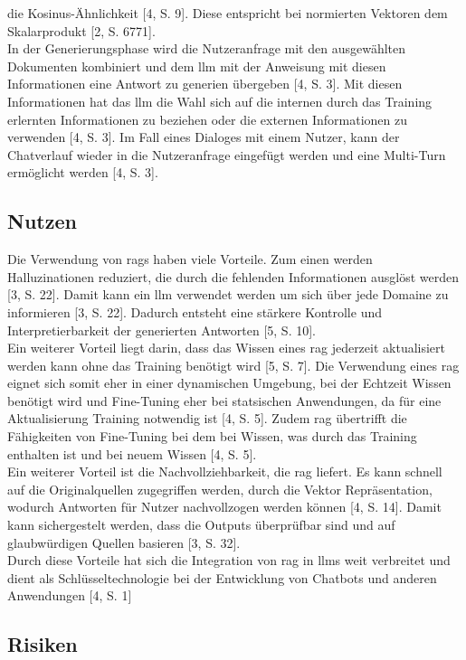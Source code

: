 die Kosinus-Ähnlichkeit [4, S. 9]. Diese entspricht bei normierten Vektoren dem Skalarprodukt  [2, S. 6771]. \\
In der Generierungsphase wird die Nutzeranfrage mit den ausgewählten Dokumenten kombiniert und dem \ac{llm} mit der Anweisung mit diesen Informationen eine 
Antwort zu generien übergeben [4, S. 3]. Mit diesen Informationen hat das \ac{llm} die Wahl sich auf die internen durch das Training erlernten Informationen zu
beziehen oder die externen Informationen zu verwenden [4, S. 3]. Im Fall eines Dialoges mit einem Nutzer, kann der Chatverlauf wieder in die Nutzeranfrage eingefügt 
werden und eine Multi-Turn ermöglicht werden [4, S. 3].

\subsection{Nutzen}

Die Verwendung von \acp{rag} haben viele Vorteile. Zum einen werden Halluzinationen reduziert, die durch die fehlenden Informationen ausglöst werden [3, S. 22]. Damit
kann ein \ac{llm} verwendet werden um sich über jede Domaine zu informieren [3, S. 22]. Dadurch entsteht eine stärkere Kontrolle und Interpretierbarkeit der
generierten Antworten [5, S. 10]. \\
Ein weiterer Vorteil liegt darin, dass das Wissen eines \ac{rag} jederzeit aktualisiert werden kann ohne das Training benötigt wird [5, S. 7]. Die Verwendung
eines \ac{rag} eignet sich somit eher in einer dynamischen Umgebung, bei der Echtzeit Wissen benötigt wird und Fine-Tuning eher bei statsischen Anwendungen, da 
für eine Aktualisierung Training notwendig ist [4, S. 5]. Zudem \ac{rag} übertrifft die Fähigkeiten von Fine-Tuning bei dem bei Wissen, was durch das Training 
enthalten ist und bei neuem Wissen [4, S. 5]. \\
Ein weiterer Vorteil ist die Nachvollziehbarkeit, die \ac{rag} liefert. Es kann schnell auf die Originalquellen zugegriffen werden, durch die Vektor Repräsentation,
wodurch Antworten für Nutzer nachvollzogen werden können [4, S. 14]. Damit kann sichergestelt werden, dass die Outputs überprüfbar sind und auf glaubwürdigen Quellen
basieren [3, S. 32]. \\
Durch diese Vorteile hat sich die Integration von \ac{rag} in \acp{llm} weit verbreitet und dient als Schlüsseltechnologie bei der Entwicklung von Chatbots und 
anderen Anwendungen [4, S. 1]

\subsection{Risiken}

